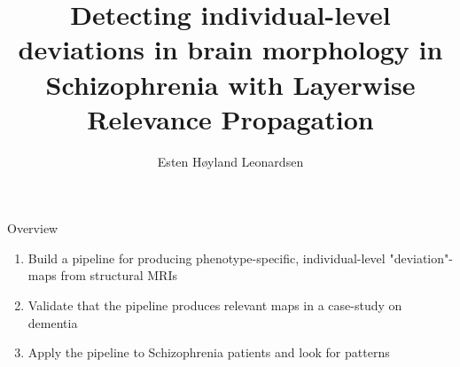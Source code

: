 \documentclass[c]{beamer}
\author{Esten H{\o}yland Leonardsen}
\title{Detecting individual-level deviations in brain morphology in Schizophrenia with Layerwise Relevance Propagation}
\begin{document}
%
	\begin{frame}{Overview}
		\begin{enumerate}
			\item Build a pipeline for producing phenotype-specific, individual-level "deviation"-maps from structural MRIs
			\item Validate that the pipeline produces relevant maps in a case-study on dementia
			\item Apply the pipeline to Schizophrenia patients and look for patterns
		\end{enumerate}
	\end{frame}
%	
%		
%
%		
\end{document}
